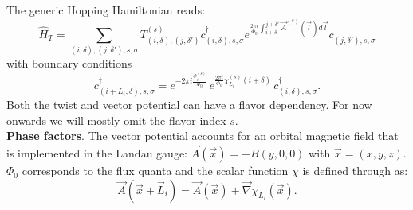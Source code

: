 The generic Hopping Hamiltonian  reads: 
\begin{equation}
\hat{H}_T = \sum_{(i,\delta), (j,\delta'), s, \sigma}    T_{(i,\delta), (j,\delta')}^{(s)}    c^{\dagger}_{(i,\delta),s,\sigma }   e^{\frac{2 \pi i}{\Phi_0} \int_{i + \delta}^{j + \delta'}  \vec{A}^{(s)}(\vec{l})  d \vec{l}} c^{}_{(j,\delta'),s,\sigma }
\label{generic_hopping.eq}
\end{equation}
with boundary conditions 
\begin{equation}
c^{\dagger}_{(i + L_i,\delta) ,s,\sigma }   =  e^{- 2 \pi i\frac{\Phi_i^{(s)}}{\Phi_0}} \, e^{\frac{2 \pi i }{\Phi_0} \chi^{(s)}_{L_i} ( i + \delta ) } \, c^{\dagger}_{(i,\delta) ,s,\sigma }.
\label{generic_boundary.eq}
\end{equation}
Both the twist and  vector  potential can have a flavor dependency. For now onwards we will  mostly omit the flavor index ${s}$.\\

\noindent
\textbf{Phase factors}.  
The vector potential accounts for an orbital magnetic field that is implemented  in the Landau  gauge:  $\vec{A}(\vec{x})  =  -B(y,0,0) $ with $ \vec{x} = (x,y,z)$. $\Phi_0$ corresponds to the flux  quanta and the scalar function $\chi$ is defined  through as:
\begin{equation}
\vec{A}( \vec{x} + \vec{L}_{i} )  = \vec{A}( \vec{x} )   +  \vec{\nabla} \chi_{L_{i}}(\vec{x}). 
\end{equation}

